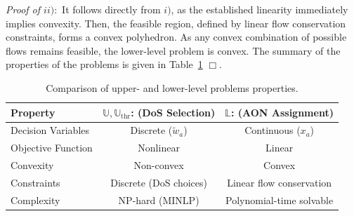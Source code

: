 \documentclass[letterpaper, 10 pt, conference]{ieeeconf}  %
\newcommand{\qedwhite}{\hfill \ensuremath{\Box}}
\begin{document}
\textit{Proof of $ii):$} It follows directly from $i)$, as the established linearity immediately implies convexity. Then, the feasible region, defined by linear flow conservation constraints, forms a convex polyhedron. As any convex combination of possible flows remains feasible, the lower-level problem is convex. The summary of the properties of the problems is given in Table~\ref{problem_properties} \qedwhite.

\begin{table}[h!]
    \centering
    \begin{tabular}{l|c|c}
        \textbf{Property} & \textbf{$\mathbb{U}, \mathbb{U}_{\text{thr}}$: (DoS Selection)} & \textbf{$\mathbb{L}$: (AON Assignment)} \\ \hline
        Decision Variables & Discrete (\( \tilde{w}_a \)) & Continuous (\( x_a \)) \\
        Objective Function & Nonlinear & Linear \\
        Convexity & Non-convex & Convex \\
        Constraints & Discrete (DoS choices) & Linear flow conservation \\
        Complexity & NP-hard (MINLP) & Polynomial-time solvable \\
    \end{tabular}
    \caption{\footnotesize Comparison of upper- and lower-level problems properties.}
    \label{problem_properties}
\end{table}









\end{document}

